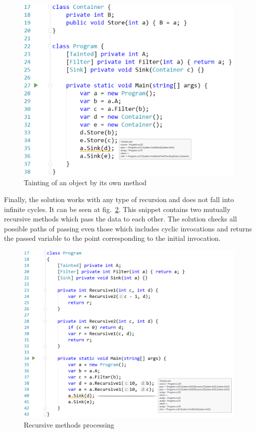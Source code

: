 \begin{figure}[h]
	\includegraphics[width=\linewidth]{screenshots/ContextSensitivity.png}
	\caption{Tainting of an object by its own method}
	\label{fig:ObjectTainting}
\end{figure}

Finally, the solution works with any type of recursion and does not fall into infinite cycles.
It can be seen at fig.~\ref{fig:Recursion}.
This snippet contains two mutually recursive methods which pass the data to each other.
The solution checks all possible paths of passing even those which includes cyclic invocations and returns the passed variable to the point corresponding to the initial invocation.

\begin{figure}[h]
	\includegraphics[width=\linewidth]{screenshots/Recursion.png}
	\caption{Recursive methods processing}
	\label{fig:Recursion}
\end{figure}

